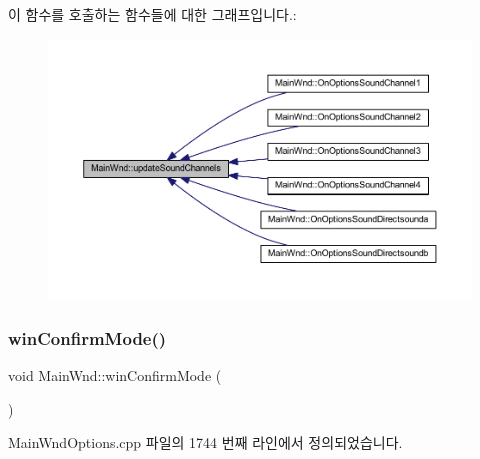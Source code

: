 이 함수를 호출하는 함수들에 대한 그래프입니다.\+:
\nopagebreak
\begin{figure}[H]
\begin{center}
\leavevmode
\includegraphics[width=350pt]{class_main_wnd_a30b67d9db53d79122684a81e549ebd1c_icgraph}
\end{center}
\end{figure}
\mbox{\label{class_main_wnd_ac2dd4c52f72943279a8d8338edc06343}} 
\subsubsection{\texorpdfstring{win\+Confirm\+Mode()}{winConfirmMode()}}
{\footnotesize\ttfamily void Main\+Wnd\+::win\+Confirm\+Mode (\begin{DoxyParamCaption}{ }\end{DoxyParamCaption})}



Main\+Wnd\+Options.\+cpp 파일의 1744 번째 라인에서 정의되었습니다.


